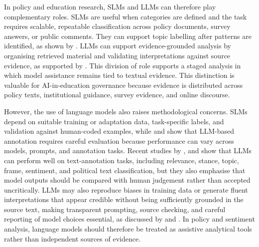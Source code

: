 In policy and education research, SLMs and LLMs can therefore play complementary
roles. SLMs are useful when categories are defined and the task requires scalable,
repeatable classification across policy documents, survey answers, or public
comments. They can support topic labelling after patterns are identified, as shown by
\cite{mekaoui2026semanticlabels}. LLMs can support evidence-grounded analysis by
organising retrieved material and validating interpretations against source evidence,
as supported by \cite{es2024ragas}. This division of role supports a staged analysis
in which model assistance remains tied to textual evidence. This distinction is
valuable for AI-in-education governance because evidence is distributed across policy
texts, institutional guidance, survey evidence, and online discourse.

However, the use of language models also raises methodological concerns. SLMs depend
on suitable training or adaptation data, task-specific labels, and validation against
human-coded examples, while \cite{weber2024evaluation} and
\cite{tornberg2024bestpractices} show that LLM-based annotation requires careful
evaluation because performance can vary across models, prompts, and annotation tasks.
Recent studies by \cite{gilardi2023chatgpt}, \cite{heseltine2024llm} and
\cite{ziems2024llms} show that LLMs can perform well on text-annotation tasks,
including relevance, stance, topic, frame, sentiment, and political text
classification, but they also emphasise that model outputs should be compared with
human judgement rather than accepted uncritically. LLMs may also reproduce biases in
training data or generate fluent interpretations that appear credible without being
sufficiently grounded in the source text, making transparent prompting, source
checking, and careful reporting of model choices essential, as discussed by
\cite{bender2021stochastic} and \cite{tornberg2024bestpractices}. In policy and
sentiment analysis, language models should therefore be treated as assistive
analytical tools rather than independent sources of evidence.

